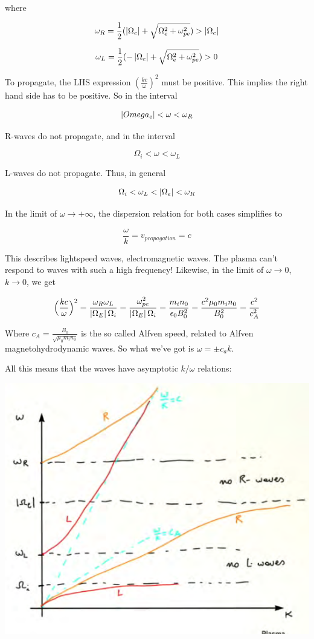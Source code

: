 \documentclass[PlasmaNotes.tex]{subfiles}
\begin{document}
where

\[ \omega_R = \frac{1}{2} (\left| \Omega_e \right|  + \sqrt{\Omega_e^2 + \omega_{pe}^2} ) > \left| \Omega_e \right| \]

\[ \omega_L = \frac{1}{2} (-\left| \Omega_e \right|  + \sqrt{\Omega_e^2 + \omega_{pe}^2} ) > 0 \]

To propagate, the LHS expression $(\frac{k c}{\omega})^2$ must be positive. This implies the right hand side has to be positive. So in the interval

\[ \left| Omega_e \right| < \omega < \omega_R \]

R-waves do not propagate, and in the interval

\[ \Omega_i < \omega < \omega_L \]

L-waves do not propagate. Thus, in general

\[ \Omega_i < \omega_L < \left| \Omega_e \right| < \omega_R \]

In the limit of $\omega \rightarrow +\infty$, the dispersion relation for both cases simplifies to

\[ \frac{\omega}{k} = v_{propagation} = c \]

This describes lightspeed waves, electromagnetic waves. The plasma can't respond to waves with such a high frequency! Likewise, in the limit of $\omega \rightarrow 0$, $k\rightarrow 0$, we get

\[ \Big(\frac{k c}{\omega}\Big)^2 = \frac{\omega_R \omega_L}{\left| \Omega_E \right| \Omega_i} = \frac{\omega_{pe}^2}{\left| \Omega_E \right| \Omega_i} = \frac{m_i n_0}{\epsilon_0 B_0^2} = \frac{c^2 \mu_0 m_i n_0}{B_0^2} = \frac{c^2}{c_A^2} \]

Where $c_A = \frac{B_0}{\sqrt{\mu_0 m_i n_0}}$ is the so called Alfven speed, related to Alfven magnetohydrodynamic waves. So what we've got is $\omega = \pm c_a k$.

All this means that the waves have asymptotic $k/\omega$ relations:

\includegraphics[width=\linewidth]{leftrightfrequencies}
\end{document}
